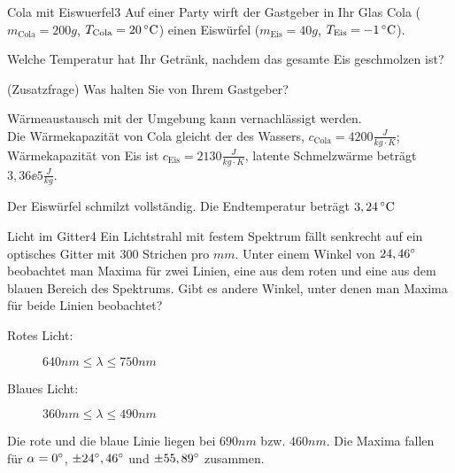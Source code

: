 


\begin{problem}{Cola mit Eiswuerfel}{3}
Auf einer Party wirft der Gastgeber in Ihr Glas Cola ($m_\mathrm{Cola} = 200\unit{g}$, $T_\mathrm{Cola} = 20\,\mathrm{^\circ C}$) einen Eiswürfel ($m_\mathrm{Eis} = 40\unit{g}$, $T_\mathrm{Eis} = -1\,\mathrm{^\circ C}$).
\begin{abcenum}
\item Welche Temperatur hat Ihr Getränk, nachdem das gesamte Eis geschmolzen ist?
\item (Zusatzfrage) Was halten Sie von Ihrem Gastgeber?
\end{abcenum}
Wärmeaustausch mit der Umgebung kann vernachlässigt werden.\\
Die Wärmekapazität von Cola gleicht der des Wassers, $c_{\mathrm{Cola}} = 4200\unit{\frac{J}{kg \cdot K}}$; Wärmekapazität von Eis ist $c_{\mathrm{Eis}} = 2130\unit{\frac{J}{kg \cdot K}}$, latente Schmelzwärme beträgt $3,36\ee{5}\unit{\frac{J}{kg}}$.
\begin{solution}
Der Eiswürfel schmilzt vollständig. Die Endtemperatur beträgt $3,24\,\mathrm{^\circ C}$
\end{solution}
\end{problem}


\begin{problem}{Licht im Gitter}{4}
Ein Lichtstrahl mit festem Spektrum fällt senkrecht auf ein optisches Gitter mit $300$ Strichen pro $\unit{mm}$.
Unter einem Winkel von $24,46^\circ$ beobachtet man Maxima für zwei Linien, eine aus dem roten und eine aus dem blauen Bereich des Spektrums.
Gibt es andere Winkel, unter denen man Maxima für beide Linien beobachtet?
\begin{description}
\item[Rotes Licht:] $640\unit{nm}\leq\lambda\leq750\unit{nm}$
\item[Blaues Licht:] $360\unit{nm}\leq\lambda\leq490\unit{nm}$
\end{description}
\begin{solution}
Die rote und die blaue Linie liegen bei $690\unit{nm}$ bzw. $460\unit{nm}$.
Die Maxima fallen für $\alpha=0^\circ$, $\pm24^\circ,46^\circ$ und $\pm55,89^\circ$ zusammen.
\end{solution}
\end{problem}


